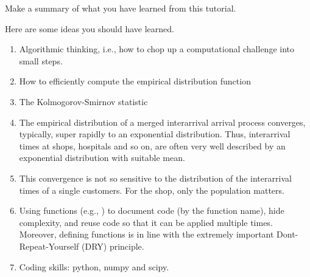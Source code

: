 \documentclass{scrartcl}
\begin{document}
\begin{exercise}
  Make a summary of what you have learned from this tutorial.
  \begin{solution}
    Here are some ideas you should have learned. 
    \begin{enumerate}
    \item Algorithmic thinking, i.e., how to chop up a computational challenge into small steps.
    \item How to efficiently compute the empirical distribution function
    \item The Kolmogorov-Smirnov statistic
    \item The empirical distribution of a  merged interarrival arrival process converges, typically, super rapidly to an exponential distribution. Thus,  interarrival times at shops, hospitals and so on, are often very well described by an exponential distribution with suitable mean. 
    \item This convergence is not so sensitive to the distribution of the interarrival times of a single customers. For the shop, only the population matters. 
    \item Using functions (e.g., )  to document code  (by the function name), hide complexity, and reuse code so that it can be applied multiple times. Moreover, defining functions is in line with the extremely important Dont-Repeat-Yourself (DRY) principle. 
    \item Coding skills: python, numpy and scipy.
    \end{enumerate}
  \end{solution}
\end{exercise}







\end{document}
